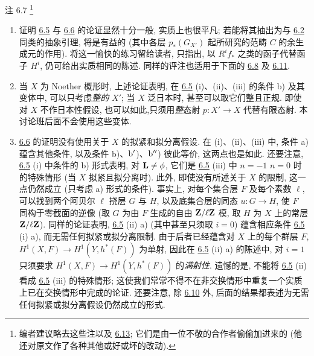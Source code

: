 \begin{enonce*}[remark]{注 6.7}
\footnote{编者建议略去这些注以及 \hyperref[XII.rems6.13]{6.13}; 它们是由一位不敬的合作者偷偷加进来的 (他还对原文作了各种其他或好或坏的改动).}
\begin{enumerate}
\renewcommand{\labelenumi}{\theenumi)}
\item 证明 \hyperref[XII.prop6.5]{6.5} 与 \hyperref[XII.cor6.6]{6.6} 的论证显然十分一般, 实质上也很平凡; 若能将其抽出为与 \hyperref[XII.lem6.2]{6.2} 同类的抽象引理, 将是有益的 (其中各层 $p_{\ast}(G_{X'})$ 起所研究的范畴 $C$ 的余生成元的作用). 将这一愉快的练习留给读者, 只指出, 以 $R^{i}f_{\ast}$ 之类的函子代替函子 $H^{i}$, 仍可给出实质相同的陈述. 同样的评注也适用于下面的 \hyperref[XII.prop6.8]{6.8} 及 \hyperref[XII.prop6.11]{6.11}.


\item 当 $X$ 为 Noether 概形时, 上述论证表明, 在 \hyperref[XII.prop6.5]{6.5} (i)、(ii)、(iii) 的条件 b) 及其变体中, 可以只考虑\emph{整的} $X'$; 当 $X$ 泛日本时, 甚至可以取它们整且正规. 即使对 $X$ 不作日本性假设, 也可以如此,\pageoriginale 只须用\emph{整}态射 $p:X'\rightarrow X$ 代替有限态射. 本讨论班后面不会使用这些变体.

\item \hyperref[XII.cor6.6]{6.6} 的证明没有使用关于 $X$ 的拟紧和拟分离假设. 在 (i)、(ii)、(iii) 中, 条件 a) 蕴含其他条件, 以及条件 b)、${\rm b'}$)、${\rm b''}$) 彼此等价, 这两点也是如此. 还要注意, \hyperref[XII.prop6.5]{6.5} (i) 中条件的 b) 形式表明, 对 $\mathbf{L}\neq\phi$, 它们是 \hyperref[XII.prop6.5]{6.5} (iii) 中 $n=-1$ \resp $n=0$ 时的特殊情形 (当 $X$ 拟紧且拟分离时). 此外, 即使没有所述关于 $X$ 的限制, 这一点仍然成立 (只考虑 a) 形式的条件). 事实上, 对每个集合层 $F$ 及每个素数 $\ell$, 可以找到两个阿贝尔 $\ell$ 挠层 $G$ 与 $H$, 以及底集合层的同态 $u:G\rightarrow H$, 使 $F$ 同构于零截面的逆像 (取 $G$ 为由 $F$ 生成的自由 $\mathbf{Z}/\ell\mathbf{Z}$ 模, 取 $H$ 为 $X$ 上的常层 $\mathbf{Z}/\ell\mathbf{Z}$). 同样的论证表明, \hyperref[XII.prop6.5]{6.5} (ii) a) (其中甚至只须取 $i=0$) 蕴含相应条件 \hyperref[XII.prop6.5]{6.5} (i) a), 而无需任何拟紧或拟分离限制. 由于后者已经蕴含对 $X$ 上的每个群层 $F$, $H^1(X,F)\rightarrow H^1(Y,h^{\ast}(F))$ 为单射, 因此在 \hyperref[XII.prop6.5]{6.5} (ii) a) 的陈述中, 对 $i=1$ 只须要求 $H^1(X,F)\rightarrow H^1(Y,h^{\ast}(F))$ 的\emph{满射性}. 遗憾的是, 不能将 \hyperref[XII.prop6.5]{6.5} (ii) 看成 \hyperref[XII.prop6.5]{6.5} (iii) 的特殊情形; 这使我们常常不得不在非交换情形中重复一个实质上已在交换情形中完成的论证. 还要注意, 除 \hyperref[XII.cor6.10]{6.10} 外, 后面的结果都表述为无需\pageoriginale 任何拟紧或拟分离假设仍然成立的形式.
\end{enumerate}
\end{enonce*}

